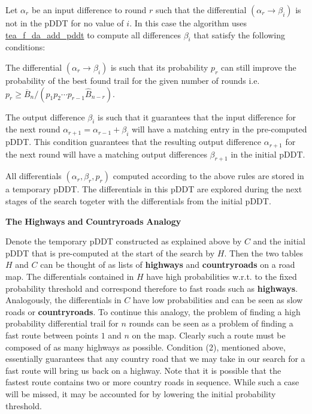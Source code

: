 \-Let $\alpha_r$ be an input difference to round $r$ such that the differential $(\alpha_r \rightarrow \beta_i)$ is not in the p\-D\-D\-T for no value of $i$. \-In this case the algorithm uses \hyperlink{tea-f-add-pddt_8hh_a379d6e4054b1bf78e6068f4cbdd06065}{tea\-\_\-f\-\_\-da\-\_\-add\-\_\-pddt} to compute all differences $\beta_i$ that satisfy the following conditions\-:


\begin{DoxyEnumerate}
\item \-The differential $(\alpha_r \rightarrow \beta_i)$ is such that its probability $p_r$ can still improve the probability of the best found trail for the given number of rounds i.\-e. $p_r \ge {{\overline B_n}}/{(p_1 p_2 \cdots p_{r-1} {\widehat B_{n-r}})}$.
\item \-The output difference $\beta_i$ is such that it guarantees that the input difference for the next round $\alpha_{r+1} = \alpha_{r-1} + \beta_{i}$ will have a matching entry in the pre-\/computed p\-D\-D\-T. \-This condition guarantees that the resulting output difference $\alpha_{r+1}$ for the next round will have a matching output differences $\beta_{r+1}$ in the initial p\-D\-D\-T.
\end{DoxyEnumerate}

\-All differentials $(\alpha_r, \beta_r, p_r)$ computed according to the above rules are stored in a temporary p\-D\-D\-T. \-The differentials in this p\-D\-D\-T are explored during the next stages of the search togeter with the differentials from the initial p\-D\-D\-T.

{\bfseries \-The} {\bfseries \-Highways} {\bfseries and} {\bfseries \-Countryroads} {\bfseries \-Analogy} 

\-Denote the temporary p\-D\-D\-T constructed as explained above by $C$ and the initial p\-D\-D\-T that is pre-\/computed at the start of the search by $ H $. \-Then the two tables $ H $ and $C$ can be thought of as lists of {\bfseries highways} and {\bfseries countryroads} on a road map. \-The differentials contained in $H$ have high probabilities w.\-r.\-t. to the fixed probability threshold and correspond therefore to fast roads such as {\bfseries highways}. \-Analogously, the differentials in $C$ have low probabilities and can be seen as slow roads or {\bfseries countryroads}. \-To continue this analogy, the problem of finding a high probability differential trail for $n$ rounds can be seen as a problem of finding a fast route between points $1$ and $n$ on the map. \-Clearly such a route must be composed of as many highways as possible. \-Condition (2), mentioned above, essentially guarantees that any country road that we may take in our search for a fast route will bring us back on a highway. \-Note that it is possible that the fastest route contains two or more country roads in sequence. \-While such a case will be missed, it may be accounted for by lowering the initial probability threshold.

